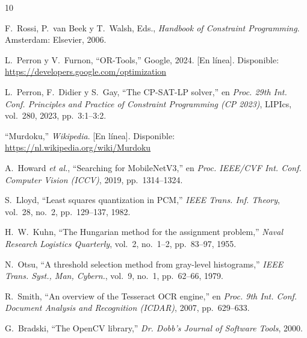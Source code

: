 \documentclass[conference,a4paper]{IEEEtran}
\begin{document}
\begin{thebibliography}{10}

F.~Rossi, P.~van Beek y T.~Walsh, Eds., \emph{Handbook of Constraint Programming}.
Amsterdam: Elsevier, 2006.

L.~Perron y V.~Furnon, ``OR-Tools,'' Google, 2024. [En línea]. Disponible:
\url{https://developers.google.com/optimization}

L.~Perron, F.~Didier y S.~Gay, ``The CP-SAT-LP solver,'' en \emph{Proc. 29th Int. Conf.
Principles and Practice of Constraint Programming (CP 2023)}, LIPIcs, vol.~280, 2023,
pp.~3:1--3:2.

``Murdoku,'' \emph{Wikipedia}. [En línea]. Disponible:
\url{https://nl.wikipedia.org/wiki/Murdoku}

A.~Howard \emph{et al.}, ``Searching for MobileNetV3,'' en \emph{Proc. IEEE/CVF Int.
Conf. Computer Vision (ICCV)}, 2019, pp.~1314--1324.

S.~Lloyd, ``Least squares quantization in PCM,'' \emph{IEEE Trans. Inf. Theory}, vol.~28,
no.~2, pp.~129--137, 1982.

H.~W.~Kuhn, ``The Hungarian method for the assignment problem,'' \emph{Naval Research
Logistics Quarterly}, vol.~2, no.~1--2, pp.~83--97, 1955.

N.~Otsu, ``A threshold selection method from gray-level histograms,'' \emph{IEEE Trans.
Syst., Man, Cybern.}, vol.~9, no.~1, pp.~62--66, 1979.

R.~Smith, ``An overview of the Tesseract OCR engine,'' en \emph{Proc. 9th Int. Conf.
Document Analysis and Recognition (ICDAR)}, 2007, pp.~629--633.

G.~Bradski, ``The OpenCV library,'' \emph{Dr. Dobb's Journal of Software Tools}, 2000.

\end{thebibliography}
\end{document}
